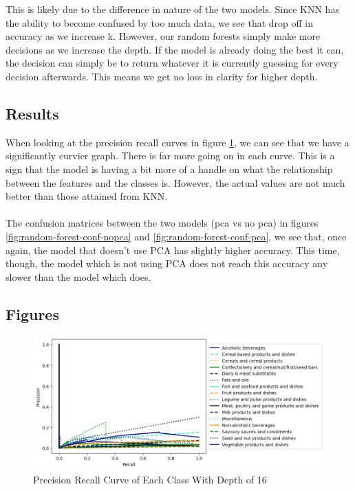 \documentclass[12pt,a4paper]{article}
\begin{document}
    This is likely due to the difference in nature of the two models. Since KNN has the ability
    to become confused by too much data, we see that drop off in accuracy as we increase k.
    However, our random forests simply make more decisions as we increase the depth. If the
    model is already doing the best it can, the decision can simply be to return whatever it
    is currently guessing for every decision afterwards. This means we get no loss in clarity
    for higher depth.

    \subsection{Results}
    When looking at the precision recall curves in figure \ref{fig:random-forest-precision-recall},
    we can see that we have a significantly curvier graph. There is far more going on in each curve.
    This is a sign that the model is having a bit more of a handle on what the relationship between the
    features and the classes is. However, the actual values are not much better than those attained from
    KNN.
    \\
    \\
    The confusion matrices between the two models (pca vs no pca) in figures \ref{fig:random-forest-conf-nopca}
    and \ref{fig:random-forest-conf-pca}, we see that, once again, the model that doesn't use PCA has slightly
    higher accuracy. This time, though, the model which is not using PCA does not reach this accuracy any
    slower than the model which does.

    \clearpage
    \subsection{Figures}
    \begin{figure}[h]
        \centering
        \includegraphics[width=\textwidth]{random-forest-precision-recall}
        \caption{Precision Recall Curve of Each Class With Depth of 16}
        \label{fig:random-forest-precision-recall}
    \end{figure}
\end{document}
